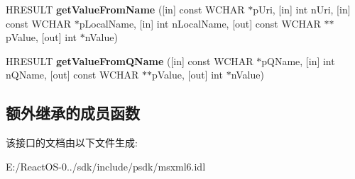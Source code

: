 \begin{DoxyCompactItemize}
\mbox{\label{interface_m_s_x_m_l2_1_1_i_s_a_x_attributes_abf8dce5410827b7f1b1cda408d6e69c9}} 
H\+R\+E\+S\+U\+LT {\bfseries get\+Value\+From\+Name} (\mbox{[}in\mbox{]} const W\+C\+H\+AR $\ast$p\+Uri, \mbox{[}in\mbox{]} int n\+Uri, \mbox{[}in\mbox{]} const W\+C\+H\+AR $\ast$p\+Local\+Name, \mbox{[}in\mbox{]} int n\+Local\+Name, \mbox{[}out\mbox{]} const W\+C\+H\+AR $\ast$$\ast$p\+Value, \mbox{[}out\mbox{]} int $\ast$n\+Value)
\item 
\mbox{\label{interface_m_s_x_m_l2_1_1_i_s_a_x_attributes_a93c818cf2223e1d6ec87f228e552cd41}} 
H\+R\+E\+S\+U\+LT {\bfseries get\+Value\+From\+Q\+Name} (\mbox{[}in\mbox{]} const W\+C\+H\+AR $\ast$p\+Q\+Name, \mbox{[}in\mbox{]} int n\+Q\+Name, \mbox{[}out\mbox{]} const W\+C\+H\+AR $\ast$$\ast$p\+Value, \mbox{[}out\mbox{]} int $\ast$n\+Value)
\end{DoxyCompactItemize}
\subsection*{额外继承的成员函数}


该接口的文档由以下文件生成\+:\begin{DoxyCompactItemize}
\item 
E\+:/\+React\+O\+S-\/0../sdk/include/psdk/msxml6.\+idl\end{DoxyCompactItemize}
